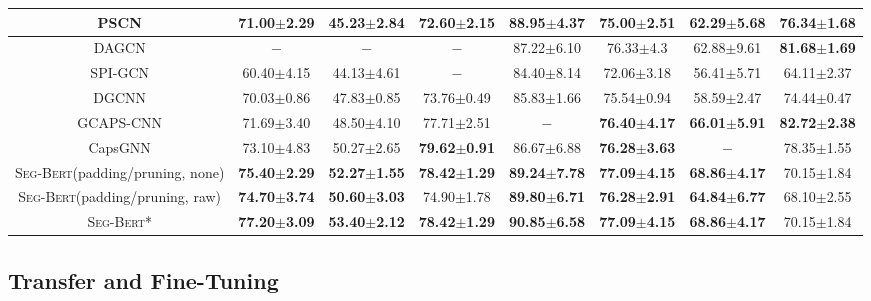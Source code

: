 \documentclass{article}
\newcommand{\our}{\textsc{Seg-Bert}}
\begin{document}
\begin{table*}[t]
\begin{tabular}{c|c|c|c|c|c|c|c}
PSCN {\scriptsize \cite{Niepert_Learning_16}} &71.00$\pm$2.29&45.23$\pm$2.84 &72.60$\pm$2.15&\textbf{88.95$\pm$4.37}&75.00$\pm$2.51&62.29$\pm$5.68&76.34$\pm$1.68 \\

\hline

DAGCN {\scriptsize \cite{Chen_Dual_19}}	&$-$&$-$&$-$&87.22$\pm$6.10	&76.33$\pm$4.3	&62.88$\pm$9.61	&\textbf{81.68$\pm$1.69}\\

SPI-GCN {\scriptsize \cite{SPIGCN}} &60.40$\pm$4.15	&44.13$\pm$4.61	&$-$	&84.40$\pm$8.14	&72.06$\pm$3.18	&56.41$\pm$5.71	&64.11$\pm$2.37\\

DGCNN {\scriptsize \cite{Zhang2018AnED}} &70.03$\pm$0.86&47.83$\pm$0.85 &73.76$\pm$0.49&85.83$\pm$1.66&75.54$\pm$0.94&58.59$\pm$2.47&74.44$\pm$0.47 \\

GCAPS-CNN {\scriptsize \cite{verma2018graph}} &71.69$\pm$3.40 &48.50$\pm$4.10 &77.71$\pm$2.51&$-$&\textbf{76.40$\pm$4.17}&\textbf{66.01$\pm$5.91}&\textbf{82.72$\pm$2.38} \\

CapsGNN {\scriptsize \cite{xinyi2018capsule}} &73.10$\pm$4.83 &50.27$\pm$2.65 &\textbf{79.62$\pm$0.91}&86.67$\pm$6.88&\textbf{76.28$\pm$3.63}&$-$&78.35$\pm$1.55 \\

\hline



{\our}(padding/pruning, none) &\textbf{75.40$\pm$2.29}&\textbf{52.27$\pm$1.55}&\textbf{78.42$\pm$1.29}&\textbf{89.24$\pm$7.78}&\textbf{77.09$\pm$4.15}&\textbf{68.86$\pm$4.17}&70.15$\pm$1.84 \\

{\our}(padding/pruning, raw) &\textbf{74.70$\pm$3.74}&\textbf{50.60$\pm$3.03}&74.90$\pm$1.78&\textbf{89.80$\pm$6.71}&\textbf{76.28$\pm$2.91}&\textbf{64.84$\pm$6.77}&68.10$\pm$2.55 \\

\hline

{\our}* &\textbf{77.20$\pm$3.09}&\textbf{53.40$\pm$2.12}&\textbf{78.42$\pm$1.29}&\textbf{90.85$\pm$6.58}&\textbf{77.09$\pm$4.15}&\textbf{68.86$\pm$4.17}&70.15$\pm$1.84\\

\hline
\end{tabular}
\vspace{-15pt}
\end{table*}


\subsection{Transfer and Fine-Tuning}
\end{document}
